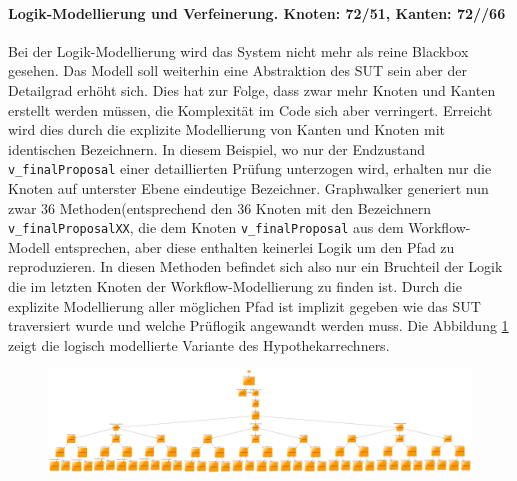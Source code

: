 \paragraph{Logik-Modellierung und Verfeinerung. Knoten: 72/51, Kanten: 72//66}
Bei der Logik-Modellierung wird das System nicht mehr als reine Blackbox gesehen. Das Modell soll weiterhin eine Abstraktion des SUT sein aber der Detailgrad erhöht sich. Dies hat zur Folge, dass zwar mehr Knoten und Kanten erstellt werden müssen, die Komplexität im Code sich aber verringert. Erreicht wird dies durch die explizite Modellierung von Kanten und Knoten mit identischen Bezeichnern. In diesem Beispiel, wo nur der Endzustand \texttt{v\_finalProposal} einer detaillierten Prüfung unterzogen wird, erhalten nur die Knoten auf unterster Ebene eindeutige Bezeichner. Graphwalker generiert nun zwar 36 Methoden(entsprechend den 36 Knoten mit den Bezeichnern \texttt{v\_finalProposalXX}, die dem Knoten \texttt{v\_finalProposal} aus dem Workflow-Modell entsprechen, aber diese enthalten keinerlei Logik um den Pfad zu reproduzieren. In diesen Methoden befindet sich also nur ein Bruchteil der Logik die im letzten Knoten der Workflow-Modellierung zu finden ist. Durch die explizite Modellierung aller möglichen Pfad ist implizit gegeben wie das SUT traversiert wurde und welche Prüflogik angewandt werden muss. Die Abbildung \ref{fig:modell_komplex} zeigt die logisch modellierte Variante des Hypothekarrechners.

\begin{figure}[h] 
  \centering
     \includegraphics[width=1.5\textwidth, angle=90]{figures/modell_komplex.png}
  \caption{}
  \label{fig:modell_komplex}
\end{figure}

